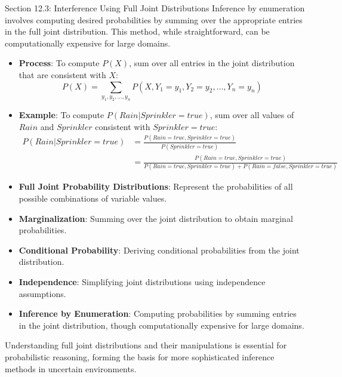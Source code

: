 \begin{notes}{Section 12.3: Interference Using Full Joint Distributions}
    Inference by enumeration involves computing desired probabilities by summing over the appropriate entries in the full joint distribution. This method, while straightforward, can be computationally 
    expensive for large domains.
    
    \begin{highlight}
    
        \begin{itemize}
            \item \textbf{Process}: To compute $P(X)$, sum over all entries in the joint distribution that are consistent with $X$:
            \[
            P(X) = \sum_{y_1, y_2, \ldots, y_n} P(X, Y_1 = y_1, Y_2 = y_2, \ldots, Y_n = y_n)
            \]
            \item \textbf{Example}: To compute $P(Rain | Sprinkler = true)$, sum over all values of $Rain$ and $Sprinkler$ consistent with $Sprinkler = true$:
            \begin{align*}
                P(Rain | Sprinkler = true) & = \frac{P(Rain = true, Sprinkler = true)}{P(Sprinkler = true)} \\
                & = \frac{P(Rain = true, Sprinkler = true)}{P(Rain = true, Sprinkler = true) + P(Rain = false, Sprinkler = true)}
            \end{align*}
        \end{itemize}
    
    \end{highlight}
    
    \begin{highlight}
    
        \begin{itemize}
            \item \textbf{Full Joint Probability Distributions}: Represent the probabilities of all possible combinations of variable values.
            \item \textbf{Marginalization}: Summing over the joint distribution to obtain marginal probabilities.
            \item \textbf{Conditional Probability}: Deriving conditional probabilities from the joint distribution.
            \item \textbf{Independence}: Simplifying joint distributions using independence assumptions.
            \item \textbf{Inference by Enumeration}: Computing probabilities by summing entries in the joint distribution, though computationally expensive for large domains.
        \end{itemize}
    
        Understanding full joint distributions and their manipulations is essential for probabilistic reasoning, forming the basis for more sophisticated inference methods in uncertain environments.
    
    \end{highlight}
\end{notes}

